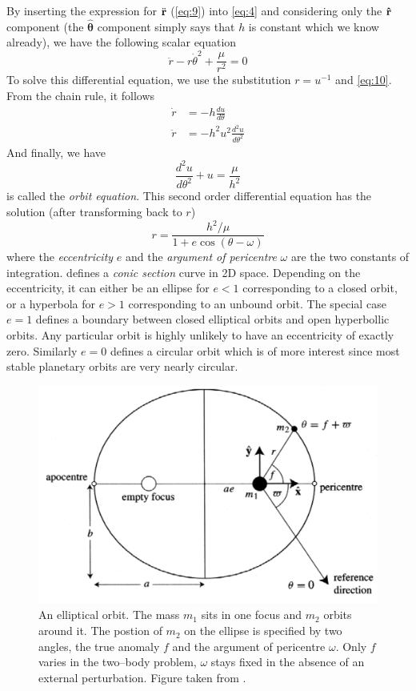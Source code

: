 \documentclass[ twoside,openright,titlepage,numbers=noenddot,headinclude,%
                footinclude=true,cleardoublepage=empty,abstractoff, %
                BCOR=5mm,paper=a4,fontsize=11pt,%
                american,%
                ]{scrreprt}
\begin{document}
By inserting the expression for $\ddot{\boldsymbol{\mathbf{r}}}$ (\cref{eq:9}) into \cref{eq:4} 
and considering only the $\boldsymbol{\mathbf{\hat r}}$ component (the $\boldsymbol{\hat\theta}$
component simply says that $h$ is constant which we know already), we have the following
scalar equation
\begin{equation}
\ddot{r}-r\dot{\theta}^2 + \frac{\mu}{r^2} =0
\end{equation}
To solve this differential equation, we use the substitution $r=u^{-1}$ and
\cref{eq:10}. From the chain rule, it follows
\begin{align}
    \dot{r}&=-h \frac{du}{d\theta} \\
    \ddot{r}&=-h^2u^2 \frac{d^2u}{d\theta^2} 
\end{align}
And finally, we have
\begin{equation}
    \frac{d^2u}{d\theta^2} +u= \frac{\mu}{h^2} 
    \label{eq:orbit_eq}
\end{equation}
 is called the \emph{orbit equation}. This second order 
differential equation has the solution (after transforming back to $r$)
\begin{equation}
    r = \frac{h^2/\mu}{1 + e\cos (\theta-\omega)} 
    \label{eq:orbit_eq_solution}
\end{equation}
where the \emph{eccentricity} $e$ and the \emph{argument of pericentre} $\omega$
are the two constants of integration.  defines 
a \emph{conic section} curve in 2D space. Depending on the eccentricity,
it can either be an ellipse for $e<1$ corresponding to a closed orbit, or
a hyperbola for $e>1$ corresponding to an unbound orbit. The special case
$e=1$ defines a boundary between closed elliptical orbits and open hyperbollic
orbits. Any
particular orbit is highly unlikely to have an eccentricity of exactly zero. 
Similarly $e=0$ defines a circular orbit which is of more interest since
most stable planetary orbits are very nearly circular.
\begin{figure}[htb]
\centering
\includegraphics[width=\linewidth]{gfx/ellipse.png}
\caption{An elliptical orbit. The mass $m_1$ sits in one focus and $m_2$ orbits 
    around it. The postion of $m_2$ on the ellipse is specified by two angles, 
    the true anomaly $f$ and the argument of pericentre $\omega$. Only $f$ 
    varies in the two--body problem, $\omega$ stays fixed in the absence of an
    external perturbation. Figure taken from \citet{murray}.}
\label{fig:ellipse}
\end{figure}
\end{document}
